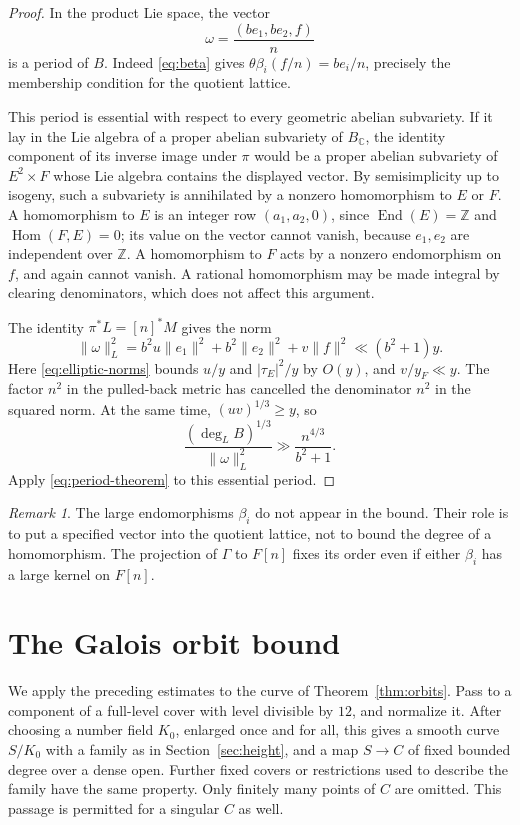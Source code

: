 \documentclass[11pt,a4paper]{article}
\numberwithin{equation}{section}
\theoremstyle{definition}
\theoremstyle{remark}
\newtheorem{remark}[theorem]{Remark}
\newcommand{\Z}{\mathbb Z}
\newcommand{\C}{\mathbb C}
\newcommand{\End}{\operatorname{End}}
\newcommand{\Hom}{\operatorname{Hom}}
\begin{document}
\begin{proof}
In the product Lie space, the vector
\[
 \omega=\frac{(be_1,be_2,f)}n
\]
is a period of \(B\). Indeed \eqref{eq:beta} gives
\(\theta\beta_i(f/n)=be_i/n\), precisely the membership condition
for the quotient lattice.

This period is essential with respect to every geometric abelian
subvariety. If it lay in the Lie algebra of a proper abelian
subvariety of \(B_\C\), the identity component of its inverse image
under \(\pi\) would be a proper abelian subvariety of
\(E^2\times F\) whose Lie algebra contains the displayed vector. By semisimplicity up to isogeny, such a
subvariety is annihilated by a nonzero homomorphism to \(E\) or \(F\).
A homomorphism to \(E\) is an integer row \((a_1,a_2,0)\), since
\(\End(E)=\Z\) and \(\Hom(F,E)=0\); its value on the vector cannot
vanish, because \(e_1,e_2\) are independent over \(\Z\).
A homomorphism to \(F\) acts by a nonzero endomorphism on \(f\),
and again cannot vanish. A rational homomorphism may be made
integral by clearing denominators, which does not affect this
argument.

The identity \(\pi^*L=[n]^*M\) gives the norm
\[
 \|\omega\|_L^2
 =b^2u\|e_1\|^2+b^2\|e_2\|^2+v\|f\|^2
 \ll(b^2+1)y.
\]
Here \eqref{eq:elliptic-norms} bounds \(u/y\) and
\(|\tau_E|^2/y\) by \(O(y)\), and \(v/y_F\ll y\).
The factor \(n^2\) in the pulled-back metric has cancelled the
denominator \(n^2\) in the squared norm.
At the same time, \((uv)^{1/3}\ge y\), so
\[
 \frac{(\deg_LB)^{1/3}}{\|\omega\|_L^2}
 \gg\frac{n^{4/3}}{b^2+1}.
\]
Apply \eqref{eq:period-theorem} to this essential period.
\end{proof}

\begin{remark}
The large endomorphisms \(\beta_i\) do not appear in the bound.
Their role is to put a specified vector into the quotient lattice,
not to bound the degree of a homomorphism. The projection of
\(\Gamma\) to \(F[n]\) fixes its order even if either \(\beta_i\)
has a large kernel on \(F[n]\).
\end{remark}

\section{The Galois orbit bound}\label{sec:orbits}

We apply the preceding estimates to the curve of
Theorem~\ref{thm:orbits}. Pass to a component of a full-level cover
with level divisible by \(12\), and normalize it. After choosing a
number field \(K_0\), enlarged once and for all, this gives a smooth
curve \(S/K_0\) with a family as in Section~\ref{sec:height}, and a
map \(S\to C\) of fixed bounded degree over a dense open.
Further fixed covers or restrictions used to describe the family
have the same property. Only finitely many points of \(C\) are
omitted. This passage is permitted for a singular \(C\) as well.
\end{document}
